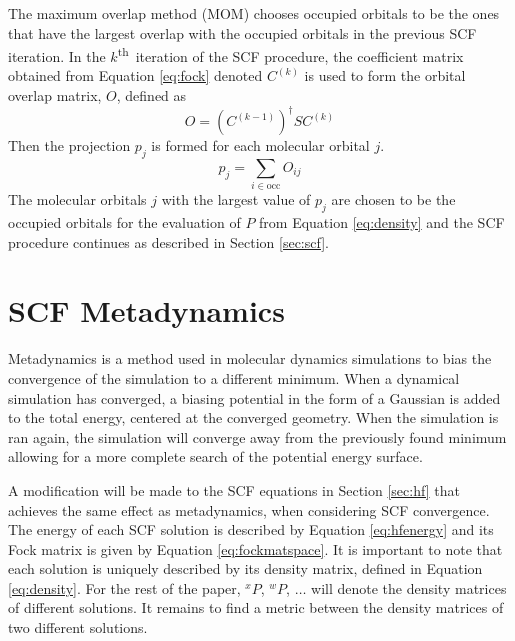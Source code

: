 \documentclass[final,3p,times,twocolumn]{elsarticle}
\newcommand{\ssth}{\textsuperscript{th}}
\begin{document}
The maximum overlap method (MOM) chooses occupied orbitals to be the ones that have the largest overlap with the occupied orbitals in the previous SCF iteration. In the $k$\ssth\ iteration of the SCF procedure, the coefficient matrix obtained from Equation \eqref{eq:fock} denoted $C^{(k)}$ is used to form the orbital overlap matrix, $O$, defined as
\begin{equation} \label{eq:momoverlap}
O = (C^{(k-1)})^\dagger S C^{(k)}
\end{equation}
Then the projection $p_j$ is formed for each molecular orbital $j$.
\begin{equation} \label{eq:momproj}
p_j = \sum_{i \in \text{occ}} O_{ij}
\end{equation}
The molecular orbitals $j$ with the largest value of $p_j$ are chosen to be the occupied orbitals for the evaluation of $P$ from Equation \eqref{eq:density} and the SCF procedure continues as described in Section \ref{sec:scf}.


\section{SCF Metadynamics} \label{sec:scfmd}

Metadynamics is a method used in molecular dynamics simulations to bias the convergence of the simulation to a different minimum.\cite{parrinello-2002} When a dynamical simulation has converged, a biasing potential in the form of a Gaussian is added to the total energy, centered at the converged geometry. When the simulation is ran again, the simulation will converge away from the previously found minimum allowing for a more complete search of the potential energy surface.

A modification will be made to the SCF equations in Section \ref{sec:hf} that achieves the same effect as metadynamics, when considering SCF convergence. The energy of each SCF solution is described by Equation \eqref{eq:hfenergy} and its Fock matrix is given by Equation \eqref{eq:fockmatspace}. It is important to note that each solution is uniquely described by its density matrix, defined in Equation \eqref{eq:density}. For the rest of the paper, $^xP$, $^wP$, $\ldots$ will denote the density matrices of different solutions. It remains to find a metric between the density matrices of two different solutions. 
\end{document}
